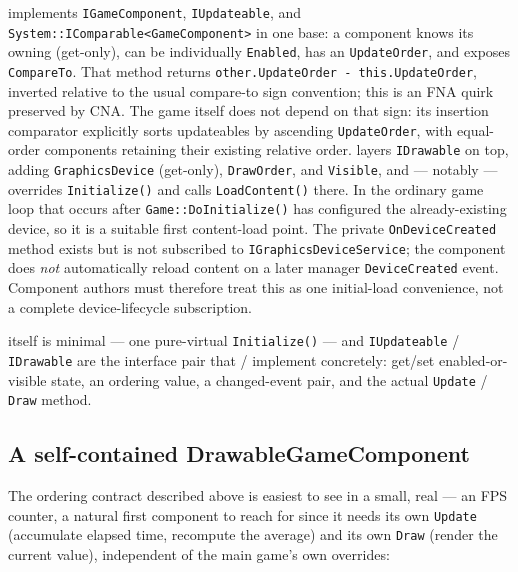  implements \texttt{IGameComponent}, \texttt{IUpdateable}, and
\texttt{System::IComparable<GameComponent>} in one base: a component knows its owning
 (get-only), can be individually \texttt{Enabled}, has an
\texttt{UpdateOrder}, and exposes \texttt{CompareTo}. That method returns
\texttt{other.UpdateOrder - this.UpdateOrder}, inverted relative to the usual compare-to sign
convention; this is an FNA quirk preserved by CNA. The game itself does not depend on that sign:
its insertion comparator explicitly sorts updateables by ascending \texttt{UpdateOrder}, with
equal-order components retaining their existing relative order.
 layers \texttt{IDrawable} on top, adding
\texttt{GraphicsDevice} (get-only), \texttt{DrawOrder}, and \texttt{Visible}, and --- notably
--- overrides \texttt{Initialize()} and calls \texttt{LoadContent()} there. In the ordinary
game loop that occurs after \texttt{Game::DoInitialize()} has configured the already-existing
device, so it is a suitable first content-load point. The private \texttt{OnDeviceCreated}
method exists but is not subscribed to \texttt{IGraphicsDeviceService}; the component does
\emph{not} automatically reload content on a later manager \texttt{DeviceCreated} event.
Component authors must therefore treat this as one initial-load convenience, not a complete
device-lifecycle subscription.

 itself is minimal --- one pure-virtual \texttt{Initialize()} ---
and \texttt{IUpdateable} / \texttt{IDrawable} are the interface pair that
 /  implement concretely: get/set
enabled-or-visible state, an ordering value, a changed-event pair, and the actual
\texttt{Update} / \texttt{Draw} method.

\subsection{A self-contained DrawableGameComponent}

The ordering contract described above is easiest to see in a small, real
 --- an FPS counter, a natural first component to reach for
since it needs its own \texttt{Update} (accumulate elapsed time, recompute the average) and its
own \texttt{Draw} (render the current value), independent of the main game's own overrides:

